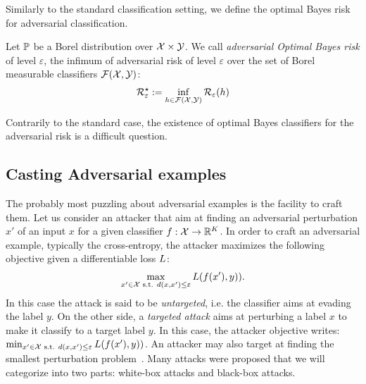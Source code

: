 Similarly to the standard classification setting, we define the optimal Bayes risk for adversarial classification. 

\begin{definition}
  Let $\mathbb{P}$ be a Borel distribution over $\mathcal{X} \times \mathcal{Y}$. We call \emph{adversarial Optimal Bayes risk} of level $\varepsilon$, the infimum of adversarial risk of level $\varepsilon$  over the set of Borel measurable classifiers $\mathcal{F}(\mathcal{X},\mathcal{Y})$:
\begin{align*}
  \mathcal{R}^\star_\varepsilon:=\inf_{h\in\mathcal{F}(\mathcal{X},\mathcal{Y})} \mathcal{R}_\varepsilon(h)
\end{align*}

\end{definition}

Contrarily to the standard case, the existence of optimal Bayes classifiers for the adversarial risk is a difficult question.


\subsection{Casting Adversarial examples}

The probably most puzzling about adversarial examples is the facility to craft them. Let us consider an attacker that aim at finding an adversarial perturbation $x'$ of an input $x$ for a given classifier $f:\mathcal{X}\to\mathbb{R}^K$.  In order to craft an adversarial example, typically the cross-entropy, the attacker maximizes the following objective given a differentiable loss $L$:
\begin{align}
    \max_{x'\in\XX\text{ s.t. } d(x,x')\leq \varepsilon}\loss\left({f}(x'), y)\right).
\end{align}
In this case the attack is said to be \emph{untargeted}, i.e. the classifier aims at evading the label $y$. On the other side, a \emph{targeted attack} aims at perturbing a label $x$ to make it classify to a target label $y$. In this case, the attacker objective writes: $\min_{x'\in\XX\text{ s.t. } d(x,x')\leq \varepsilon}\loss\left({f}(x'), y)\right)$. An attacker may also target at finding the smallest perturbation problem~\citep{moosavi2016deepfool,carlini2017towards}.  Many attacks were proposed that we will categorize into two parts: white-box attacks and black-box attacks.
